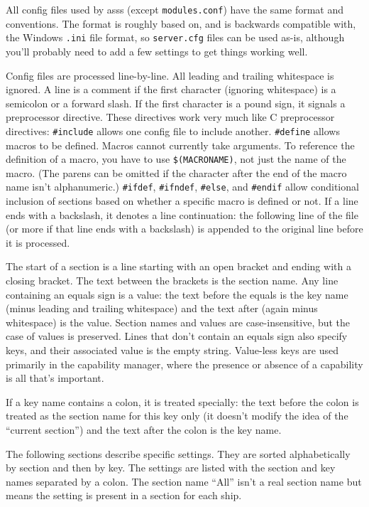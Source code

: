 \documentclass{article}
\newcommand{\asss}{asss}
\begin{document}
All config files used by \asss{} (except \verb/modules.conf/) have the
same format and conventions. The format is roughly based on, and is
backwards compatible with, the Windows \verb/.ini/ file format, so
\verb/server.cfg/ files can be used as-is, although you'll probably need
to add a few settings to get things working well.

Config files are processed line-by-line. All leading and trailing
whitespace is ignored. A line is a comment if the first character
(ignoring whitespace) is a semicolon or a forward slash. If the first
character is a pound sign, it signals a preprocessor directive. These
directives work very much like C preprocessor directives:
\verb/#include/ allows one config file to include another.
\verb/#define/ allows macros to be defined. Macros cannot currently take
arguments. To reference the definition of a macro, you have to use
\verb/$(MACRONAME)/, not just the name of the macro. (The parens can be
omitted if the character after the end of the macro name isn't
alphanumeric.) \verb/#ifdef/, \verb/#ifndef/, \verb/#else/, and
\verb/#endif/ allow conditional inclusion of sections based on whether a
specific macro is defined or not. If a line ends with a backslash, it
denotes a line continuation: the following line of the file (or more if
that line ends with a backslash) is appended to the original line before
it is processed.

The start of a section is a line starting with an open bracket and
ending with a closing bracket. The text between the brackets is the
section name. Any line containing an equals sign is a value: the text
before the equals is the key name (minus leading and trailing
whitespace) and the text after (again minus whitespace) is the value.
Section names and values are case-insensitive, but the case of values is
preserved. Lines that don't contain an equals sign also specify keys,
and their associated value is the empty string. Value-less keys are used
primarily in the capability manager, where the presence or absence of a
capability is all that's important.

If a key name contains a colon, it is treated specially: the text before
the colon is treated as the section name for this key only (it doesn't
modify the idea of the ``current section'') and the text after the colon
is the key name.

The following sections describe specific settings. They are sorted
alphabetically by section and then by key. The settings are listed with
the section and key names separated by a colon. The section name ``All''
isn't a real section name but means the setting is present in a section
for each ship.
\end{document}
